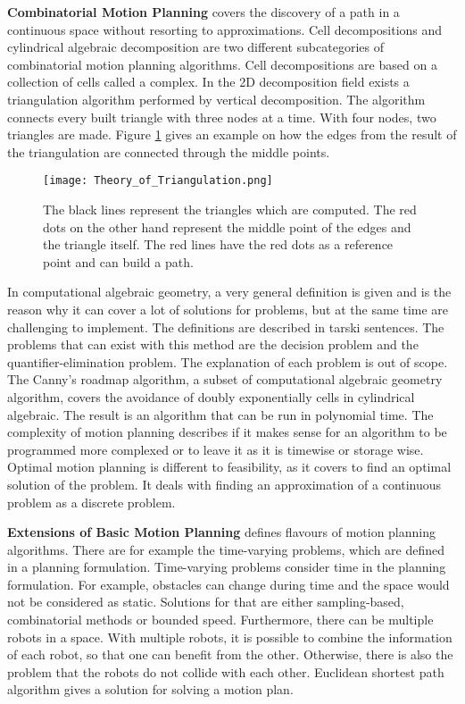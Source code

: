 \textbf{Combinatorial Motion Planning} covers the discovery of a path in a continuous space without resorting to approximations. Cell decompositions and cylindrical algebraic decomposition are two different subcategories of combinatorial motion planning algorithms. Cell decompositions are based on a collection of cells called a complex. In the 2D decomposition field exists a triangulation algorithm performed by vertical decomposition. The algorithm connects every built triangle with three nodes at a time. With four nodes, two triangles are made. Figure \ref{fig:Theory of Triangulation} gives an example on how the edges from the result of the triangulation are connected through the middle points.
\begin{figure}[H]
    \centering
    \texttt{[image: Theory\_of\_Triangulation.png]}
    \caption{The black lines represent the triangles which are computed. The red dots on the other hand represent the middle point of the edges and the triangle itself. The red lines have the red dots as a reference point and can build a path. \cite{planning_algorithms_steven_m_lavalle}}
    \label{fig:Theory of Triangulation}
\end{figure}
In computational algebraic geometry, a very general definition is given and is the reason why it can cover a lot of solutions for problems, but at the same time are challenging to implement. The definitions are described in tarski sentences. The problems that can exist with this method are the  decision problem and the quantifier-elimination problem. The explanation of each problem is out of scope. The Canny's roadmap algorithm, a subset of computational algebraic geometry algorithm, covers the avoidance of doubly exponentially cells in cylindrical algebraic. \cite{constructing_roadmaps_of_semi-algebraic_sets_I} The result is an algorithm that can be run in polynomial time. The complexity of motion planning describes if it makes sense for an algorithm to be programmed more complexed or to leave it as it is timewise or storage wise. Optimal motion planning is different to feasibility, as it covers to find an optimal solution of the problem. It deals with finding an approximation of a continuous problem as a discrete problem. \cite{planning_algorithms_steven_m_lavalle}

\textbf{Extensions of Basic Motion Planning} defines flavours of motion planning algorithms. There are for example the time-varying problems, which are defined in a planning formulation. Time-varying problems consider time in the planning formulation. For example, obstacles can change during time and the space would not be considered as static. Solutions for that are either sampling-based, combinatorial methods or bounded speed. Furthermore, there can be multiple robots in a space. With multiple robots, it is possible to combine the information of each robot, so that one can benefit from the other. Otherwise, there is also the problem that the robots do not collide with each other. \cite{planning_algorithms_steven_m_lavalle} Euclidean shortest path algorithm gives a solution for solving a motion plan. \cite{efficient_computation_of_euclidean_shortest_paths_in_the_plane}

